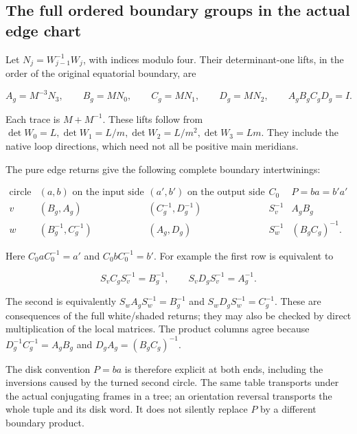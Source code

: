 \subsection{The full ordered boundary groups in the actual edge chart}\label{gi:the-full-ordered-boundary-groups-in-the-actual-edge-chart}

Let \(N_j=W_{j-1}^{-1}W_j\), with indices modulo four.
Their determinant-one lifts, in the order of the original
equatorial boundary, are

\begin{equation}\label{gi:S14a}
A_g=M^{-3}N_3,\qquad B_g=MN_0,\qquad
 C_g=MN_1,\qquad D_g=MN_2,\qquad
                    A_gB_gC_gD_g=I.
\end{equation}

Each trace is \(M+M^{-1}\). These lifts follow from
\(\det W_0=L,\det W_1=L/m,\det W_2=L/m^2,\det W_3=Lm\).
They include the native loop directions, which need not all be
positive main meridians.

The pure edge returns give the following complete boundary
intertwinings:

\begin{equation}\label{gi:S14b}
\begin{array}{c|c|c|c|c}
 \text{circle}&(a,b)\text{ on the input side}
 &(a',b')\text{ on the output side}&C_0&P=ba=b'a'\\ \hline
 v&(B_g,A_g)&(C_g^{-1},D_g^{-1})&S_v^{-1}&A_gB_g\\
 w&(B_g^{-1},C_g^{-1})&(A_g,D_g)&S_w^{-1}&(B_gC_g)^{-1}.
\end{array}
\end{equation}

Here \(C_0aC_0^{-1}=a'\) and \(C_0bC_0^{-1}=b'\).
For example the first row is equivalent to

\begin{equation}\label{gi:S14c}
S_v C_g S_v^{-1}=B_g^{-1},\qquad
 S_v D_g S_v^{-1}=A_g^{-1}.
\end{equation}

The second is equivalently
\(S_w A_gS_w^{-1}=B_g^{-1}\) and
\(S_w D_gS_w^{-1}=C_g^{-1}\).
These are consequences of the full white/shaded returns;
they may also be checked by direct multiplication of the local
matrices. The product columns agree because
\(D_g^{-1}C_g^{-1}=A_gB_g\) and
\(D_gA_g=(B_gC_g)^{-1}\).

The disk convention \(P=ba\) is therefore explicit at both
ends, including the inversions caused by the turned second
circle. The same table transports under the actual conjugating
frames in a tree; an orientation reversal transports the whole
tuple and its disk word. It does not silently replace \(P\)
by a different boundary product.

